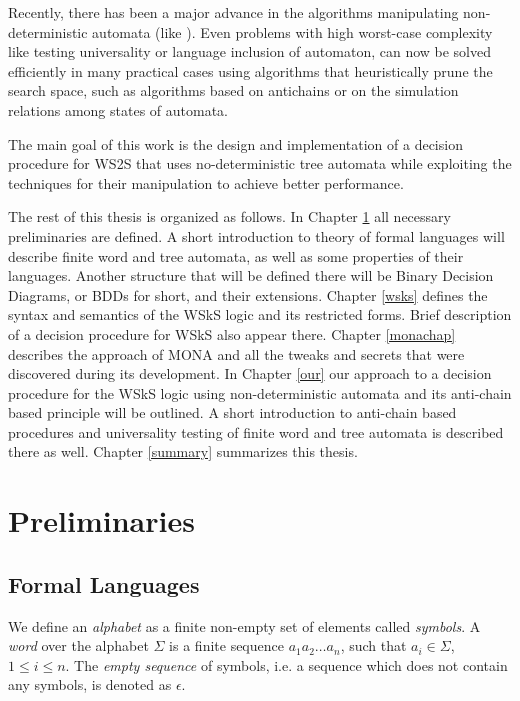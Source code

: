 Recently, there has been a major advance in the algorithms manipulating non-deterministic automata (like \cite{vata}). Even problems with high worst-case complexity like testing universality or language inclusion of automaton, can now be solved efficiently in many practical cases using algorithms that heuristically prune the search space, such as algorithms based on antichains or on the simulation relations among states of automata.

The main goal of this work is the design and implementation of a decision procedure for WS2S that uses no-deterministic tree automata while exploiting the techniques for their manipulation to achieve better performance.

The rest of this thesis is organized as follows. In Chapter \ref{preli} all necessary preliminaries are defined. A short introduction to theory of formal languages will describe finite word and tree automata, as well as some properties of their languages. Another structure that will be defined there will be Binary Decision Diagrams, or BDDs for short, and their extensions. Chapter \ref{wsks} defines the syntax and semantics of the WSkS logic and its restricted forms. Brief description of a decision procedure for WSkS also appear there. Chapter \ref{monachap} describes the approach of \textsc{MONA} and all the tweaks and secrets that were discovered during its development. In Chapter \ref{our} our approach to  a decision procedure for the WSkS logic using non-deterministic automata and its anti-chain based principle will be outlined. A short introduction to anti-chain based procedures and universality testing of finite word and tree automata is described there as well. Chapter \ref{summary} summarizes this thesis.

\chapter{Preliminaries}\label{preli}

 \section{Formal Languages}

 We define an \emph{alphabet} as a finite non-empty set of elements called \emph{symbols}. A \emph{word} over the alphabet $\Sigma$ is a finite sequence $a_1a_2\ldots a_n$, such that $a_i \in \Sigma$, $1 \leq i \leq n$. The \emph{empty sequence} of symbols, i.e. a sequence  which does not contain any symbols, is denoted as $\epsilon$. 

